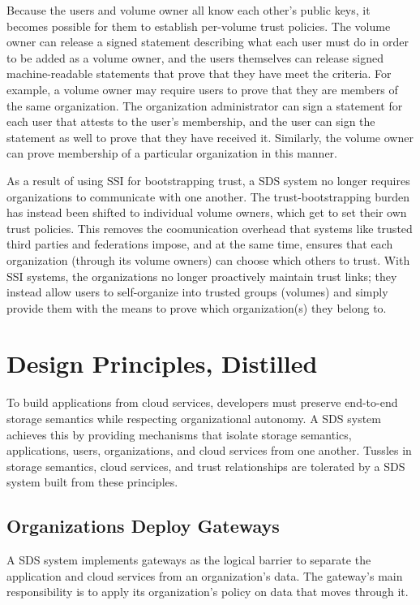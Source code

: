 Because the users and volume owner all know each other's public keys, it becomes
possible for them to establish per-volume trust policies.  The volume owner
can release a signed statement describing what each user must do in order to be
added as a volume owner, and the users themselves can release signed
machine-readable statements that prove that they have meet the criteria.  For example, a volume owner may
require users to prove that they are members of the same organization.  The
organization administrator can sign a statement for each user that attests to the user's
membership, and the user can sign the statement as well to prove that they have
received it.  Similarly, the volume owner can prove membership of a particular
organization in this manner.

As a result of using SSI for bootstrapping trust, a SDS system no longer requires
organizations to communicate with one another.
The trust-bootstrapping burden has instead been shifted to individual volume
owners, which get to set their own trust policies.  This removes the
coomunication overhead that systems like trusted third parties and federations
impose, and at the same time, ensures that each organization (through its volume
owners) can choose which others to trust.  With SSI systems, the 
organizations no longer proactively maintain trust links; they instead allow
users to self-organize into trusted groups (volumes) and simply provide them
with the means to prove which organization(s) they belong to.

\section{Design Principles, Distilled}

To build applications from cloud services, developers must preserve
end-to-end storage semantics while respecting organizational autonomy.
A SDS system achieves this by providing mechanisms that isolate storage semantics, applications,
users, organizations, and cloud services from one another.  Tussles in storage
semantics, cloud services, and trust relationships are tolerated by a SDS system
built from these principles.

\subsection{Organizations Deploy Gateways}

A SDS system implements gateways as
the logical barrier to separate the application and
cloud services from an organization's data.  The gateway's main
responsibility is to apply its organization's policy on data
that moves through it.

